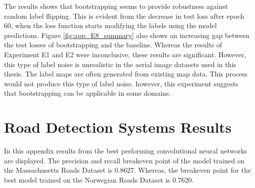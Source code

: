 The results shows that bootstrapping seems to provide robustness against random label flipping. This is evident from the decrease in test loss after epoch 60, when the loss function starts modifying the labels using the model predictions. Figure \ref{fig:app_E8_summary} also shows an increasing gap between the test losses of bootstrapping and the baseline. Whereas the results of Experiment E1 and E2 were inconclusive, these results are significant. However, this type of label noise is unrealistic in the aerial image datasets used in this thesis. The label maps are often generated from existing map data. This process would not produce this type of label noise. however, this experiment suggests that bootstrapping can be applicable in some domains. \pagebreak

\section{Road Detection Systems Results}
\label{app:roaddetectionresults}
In this appendix results from the best performing convolutional neural networks are displayed. The precision and recall breakeven point of the model trained on the Massachusetts Roads Dataset is 0.8627. Whereas, the breakeven point for the best model trained on the Norwegian Roads Dataset is 0.7620.

